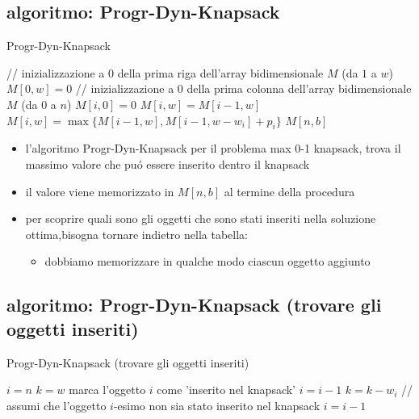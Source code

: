 \subsection*{algoritmo: Progr-Dyn-Knapsack}
\begin{flushleft}
	\begin{algorithm}
		\caption{Progr-Dyn-Knapsack}
		\begin{algorithmic}
			\STATE \color{gray} // inizializzazione a $0$ della prima riga dell'array bidimensionale $M$ (da $1$ a $w$) \color{black}
				\STATE $M[0,w]=0$
			\ENDFOR
			\STATE \color{gray} // inizializzazione a $0$ della prima colonna dell'array bidimensionale $M$ (da $0$ a $n$) \color{black}
				\STATE $M[i,0]=0$
			\ENDFOR
						\STATE $M[i,w]=M[i-1,w]$
					\ELSE
						\STATE $M[i,w]=\max\{M[i-1,w],M[i-1,w-w_i]+p_i\}$
					\ENDIF
				\ENDFOR
			\ENDFOR
			\RETURN $M[n,b]$
		\end{algorithmic}
	\end{algorithm}
	\begin{itemize}
		\item l'algoritmo Progr-Dyn-Knapsack per il problema max 0-1 knapsack, trova il massimo valore che pu\'o essere inserito dentro il knapsack
		\item il valore viene memorizzato in $M[n,b]$ al termine della procedura
		\item per scoprire quali sono gli oggetti che sono stati inseriti nella soluzione ottima,bisogna tornare indietro nella tabella:
		\begin{itemize}
			\item dobbiamo memorizzare in qualche modo ciascun oggetto aggiunto
		\end{itemize}
	\end{itemize}
\end{flushleft}


\subsection*{algoritmo: Progr-Dyn-Knapsack (trovare gli oggetti inseriti)}
\begin{flushleft}
	\begin{algorithm}
		\caption{Progr-Dyn-Knapsack (trovare gli oggetti inseriti)}
		\begin{algorithmic}
			\STATE $i=n$
			\STATE $k=w$
			\IF{$M[i,k]\neq M[i-1,k]$}
				\STATE marca l'oggetto $i$ come 'inserito nel knapsack'
				\STATE $i=i-1$
				\STATE $k=k-w_i$
			\ELSE
				\STATE \color{gray} // assumi che l'oggetto $i$-esimo non sia stato inserito nel knapsack \color{black}
				\STATE $i=i-1$
			\ENDIF
		\end{algorithmic}
	\end{algorithm}
\end{flushleft}

